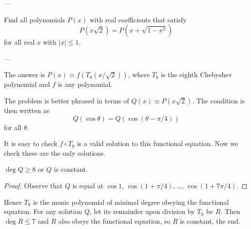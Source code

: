 
---

Find all polynomials $P(x)$ with real coefficients that satisfy \[P\left(x\sqrt2\right)=P\left(x+\sqrt{1-x^2}\right)\]
for all real $x$ with $\lvert x\rvert\le1$.

---

The answer is $P(x)\equiv f(T_8(x/\sqrt2))$, where $T_8$ is the eighth Chebyshev polynomial and $f$ is any polynomial.

The problem is better phrased in terms of $Q(x)\equiv P(x\sqrt2)$. The condition is then written as \[Q(\cos\theta)=Q(\cos(\theta-\pi/4))\]
for all $\theta$.

It is easy to check $f\circ T_8$ is a valid solution to this functional equation. Now we check these are the only solutions.
\begin{claim*}
    $\deg Q\ge8$ or $Q$ is constant.
\end{claim*}
\begin{proof}
    Observe that $Q$ is equal at $\cos1$, $\cos(1+\pi/4)$, \ldots, $\cos(1+7\pi/4)$.
\end{proof}

Hence $T_8$ is the monic polynomial of minimal degree obeying the functional equation. For any solution $Q$, let its remainder upon division by $T_8$ be $R$. Then $\deg R\le7$ and $R$ also obeys the functional equation, so $R$ is constant, the end.

